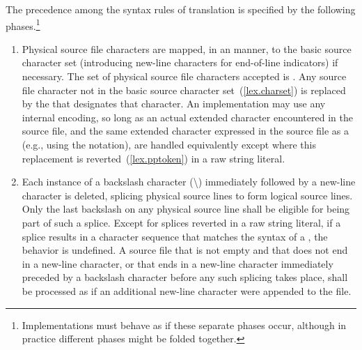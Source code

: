 \pnum
{}%
The precedence among the syntax rules of translation is specified by the
following phases.\footnote{Implementations must behave as if these separate phases
occur, although in practice different phases might be folded together.}

\begin{enumerate}
%
%
%
\item Physical source file characters are mapped, in an
 manner,
to the basic source character set (introducing new-line characters for end-of-line
indicators) if necessary.
The set of physical source file characters accepted is .
Any
source file character not in the basic source character
set~(\ref{lex.charset}) is replaced by the
 that
designates that character. An implementation may use any internal
encoding, so long as an actual extended character encountered in the
source file, and the same extended character expressed in the source
file as a  (e.g., using the  notation), are handled equivalently
except where this replacement is reverted~(\ref{lex.pptoken}) in a raw string literal.

%
\item Each instance of a backslash character (\textbackslash)
immediately followed by a new-line character is deleted, splicing
physical source lines to form logical source lines. Only the last
backslash on any physical source line shall be eligible for being part
of such a splice.
Except for splices reverted in a raw string literal, if a splice results in
a character sequence that matches the
syntax of a , the behavior is
undefined. A source file that is not empty and that does not end in a new-line
character, or that ends in a new-line character immediately preceded by a
backslash character before any such splicing takes place,
shall be processed as if an additional new-line character were appended
to the file.


\end{enumerate}
